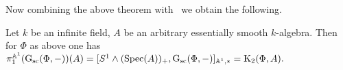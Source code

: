 \documentclass[oneside, 11pt]{amsart} \pdfoutput=1
\begin{document}
Now combining the above theorem with~\cite[Theorem~4.3.1]{AHW18} we obtain the following.
\begin{corollary} \label{cor:motivic-pi1} Let $k$ be an infinite field, $A$ be an arbitrary essentially smooth $k$-algebra. Then for $\Phi$ as above one has $\pi_1^{\mathbb{A}^1}(\mathrm{G}_\mathrm{sc}(\Phi, -))(A) = [S^1 \wedge (\mathrm{Spec}(A))_+, \mathrm{G}_\mathrm{sc}(\Phi, -)]_{ \mathbb{A}^1,*} = {\mathrm{K}}_2(\Phi, A).$
\end{corollary}

\printbibliography
\end{document}

